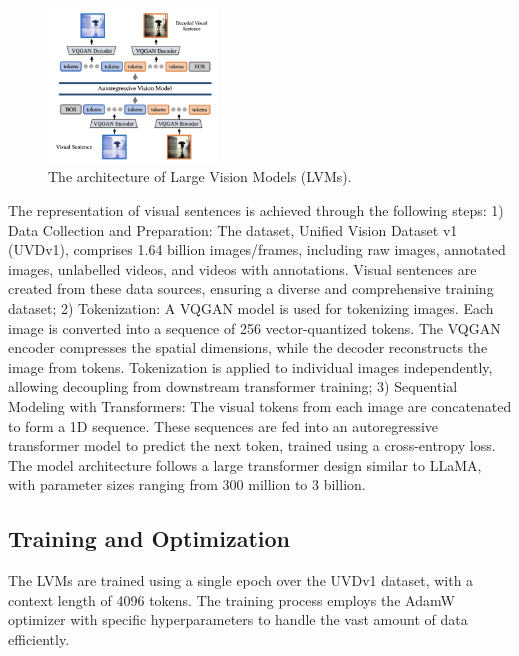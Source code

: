 \documentclass[conference]{IEEEtran}
\theoremstyle{definition}
\theoremstyle{plain}
\theoremstyle{remark}
\begin{document}
\begin{figure}[!htbp]
    \centering
    \includegraphics[width=0.4\textwidth]{LVM-architecture.png}
    \caption{The architecture of Large Vision Models (LVMs).}
    \label{fig:LVM-architecture}
\end{figure}

The representation of visual sentences is achieved through the following steps:
1) Data Collection and Preparation:
The dataset, Unified Vision Dataset v1 (UVDv1), comprises 1.64 billion images/frames, including raw images, annotated images, unlabelled videos, and videos with annotations.
Visual sentences are created from these data sources, ensuring a diverse and comprehensive training dataset;
2) Tokenization:
A VQGAN model is used for tokenizing images. Each image is converted into a sequence of 256 vector-quantized tokens. The VQGAN encoder compresses the spatial dimensions, while the decoder reconstructs the image from tokens.
Tokenization is applied to individual images independently, allowing decoupling from downstream transformer training;
3) Sequential Modeling with Transformers:
The visual tokens from each image are concatenated to form a 1D sequence. These sequences are fed into an autoregressive transformer model to predict the next token, trained using a cross-entropy loss.
The model architecture follows a large transformer design similar to LLaMA, with parameter sizes ranging from 300 million to 3 billion.

\subsection{Training and Optimization}
The LVMs are trained using a single epoch over the UVDv1 dataset, with a context length of 4096 tokens. The training process employs the AdamW optimizer with specific hyperparameters to handle the vast amount of data efficiently.
\end{document}
